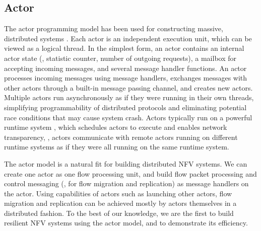 \subsection{Actor}

The actor programming model has been used for constructing massive, distributed systems \cite{actor-wiki, akka, newell2016optimizing, AnalysisActor}. Each actor is an independent execution unit, which can be viewed as a logical thread. In the simplest form, an actor contains an internal actor state (\eg, statistic counter, number of outgoing requests), a mailbox for accepting incoming messages, and several message handler functions. An actor processes incoming messages using message handlers, exchanges messages with other actors through a built-in message passing channel, and creates new actors. %
Multiple actors run asynchronously %
 as if they were running in their own threads, simplifying programmability of distributed protocols and eliminating potential race conditions that may cause system crash.
Actors typically run on a powerful runtime system \cite{erlang, akka, caf}, which schedules actors to execute and enables network transparency, \ie, actors communicate with remote actors running on different runtime systems as if they were all running on the same runtime system.


The actor model is a natural fit for building distributed NFV systems. We can create one actor as one flow processing unit, %
 and build flow packet processing and control messaging (\eg, for flow migration and replication) as message handlers on the actor. Using capabilities of actors such as launching other actors, flow migration and replication can be achieved mostly by actors themselves in a distributed fashion. %
 To the best of our knowledge, we are the first to build resilient NFV systems using the actor model, and to demonstrate its efficiency.



